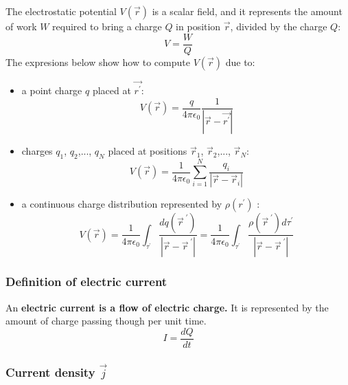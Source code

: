 \documentclass[english,11pt]{article}
\begin{document}
The electrostatic potential $V(\vec{r})$ is a scalar field,
and it represents the amount of work $W$ required to bring a charge $Q$
in position $\vec{r}$, divided by the charge $Q$:
\begin{equation*}
     V = \frac{W}{Q}
\end{equation*}
The expresions below show how to compute $V(\vec{r})$ due to:
\begin{itemize}
\item a point charge $q$ placed at $\vec{r^{\prime}}$:
 \begin{equation*}
      V(\vec{r}) = \frac{q}{4\pi\epsilon_0} \frac{1}{|\vec{r}-\vec{r^{\prime}}|}
 \end{equation*}

\item charges $q_1$, $q_2$,..., $q_N$ placed at positions
      $\vec{r}_1$, $\vec{r}_2$,..., $\vec{r}_N$:
  \begin{equation*}
      V(\vec{r}) = \frac{1}{4\pi\epsilon_0}
            \sum_{i=1}^{N} \frac{q_i}{|\vec{r}-\vec{r}_{i}|}
  \end{equation*}

\item a continuous charge distribution represented by $\rho(r^{\prime})$ :
\begin{equation*}
   V(\vec{r}) = \frac{1}{4\pi\epsilon_0}
     \int_{\tau^\prime} \frac{dq(\vec{r}^{\;\prime})}{|\vec{r}-\vec{r}^{\;\prime}|}
     = \frac{1}{4\pi\epsilon_0}
     \int_{\tau^\prime} \frac{\rho(\vec{r}^{\;\prime})d\tau^\prime}{|\vec{r}-\vec{r}^{\;\prime}|}
\end{equation*}

\end{itemize}


\subsubsection*{\bf Definition of electric current}

An {\bf electric current is a flow of electric charge.}
It is represented by the amount of charge passing though per unit time.
\begin{equation*}
  I = \frac{dQ}{dt}
\end{equation*}

\subsubsection*{\bf Current density $\vec{j}$}
\end{document}
